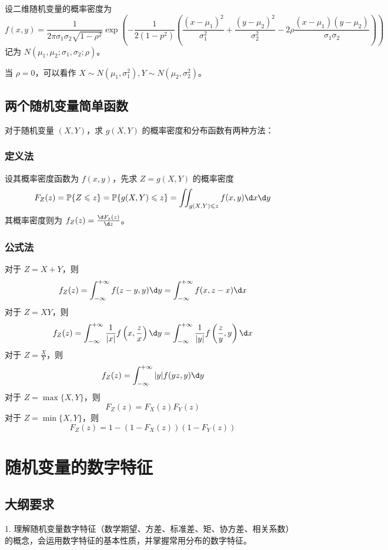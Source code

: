 设二维随机变量的概率密度为
\[ f(x, y) = \frac{1}{2 \pi \sigma_1 \sigma_2 \sqrt{1 - \rho^2}} \exp \left( -\frac{1}{2(1-p^2)} \left(\frac{(x-\mu_1)^2}{\sigma_1^2} + \frac{(y-\mu_2)^2}{\sigma_2^2} - 2 \rho\frac{(x-\mu_1)(y-\mu_2)}{\sigma_1 \sigma_2}\right) \right) \]
记为 $N(\mu_1, \mu_2; \sigma_1, \sigma_2; \rho)$。

当 $\rho = 0$，可以看作 $X \sim N(\mu_1, \sigma_1^2), Y \sim N(\mu_2, \sigma_2^2)$。

\subsection{两个随机变量简单函数}

对于随机变量 $(X, Y)$，求 $g(X, Y)$ 的概率密度和分布函数有两种方法：

\subsubsection*{定义法}

设其概率密度函数为 $f(x, y)$，先求 $Z = g(X, Y)$ 的概率密度
\[ F_Z(z) = \bbP\{Z \leqslant z\} = \bbP\{g(X,Y) \leqslant z\} = \iint_{g(X,Y) \leqslant z} f(x, y) \d x \d y \]
其概率密度则为 $f_Z(z) = \frac{\d F_z(z)}{\d z}$。

\subsubsection*{公式法}

对于 $Z = X + Y$，则
\[ f_Z(z) = \int_{-\infty}^{+\infty} f(z - y, y) \d y = \int_{-\infty}^{+\infty} f(x, z - x) \d x \]
对于 $Z = XY$，则
\[ f_Z(z) = \int_{-\infty}^{+\infty} \frac{1}{|x|}f\left(x, \frac{z}{x}\right) \d y = \int_{-\infty}^{+\infty} \frac{1}{|y|}f\left(\frac{z}{y}, y\right) \d x \]
对于 $Z = \frac{X}{Y}$，则
\[ f_Z(z) = \int_{-\infty}^{+\infty} |y|f(yz, y) \d y \]
对于 $Z = \max\{X, Y\}$，则
\[ F_Z(z) = F_X(z)F_Y(z) \]
对于 $Z = \min\{X, Y\}$，则
\[ F_Z(z) = 1 - (1 - F_X(z))(1 - F_Y(z)) \]

\section{随机变量的数字特征}

\subsection{大纲要求}

1. 理解随机变量数字特征（数学期望、方差、标准差、矩、协方差、相关系数）的概念，会运用数字特征的基本性质，并掌握常用分布的数字特征。


